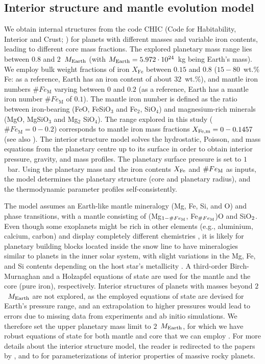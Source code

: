 \documentclass[draft]{agujournal2019} %
\begin{document}
\subsection{Interior structure and mantle evolution model}
\label{sec:int_struc}

We obtain internal structures from the code CHIC (Code for Habitability, Interior and Crust; ) for planets with different masses and variable iron contents, leading to different core mass fractions. The explored planetary mass range lies between $0.8$ and $2$~$M_{\rm Earth}$ (with $M_{\rm Earth}=5.972 \cdot 10^{\rm 24}$~kg being Earth's mass). We employ bulk weight fractions of iron $X_{\mathrm{Fe}}$ between $0.15$ and $0.8$ ($15-80$~wt.\% Fe: as a reference, Earth has an iron content of about $32$~wt.\%), and mantle iron numbers $\# Fe_{\mathrm{M}}$ varying between $0$ and $0.2$ (as a reference, Earth has a mantle iron number $\# Fe_{\mathrm{M}}$ of $0.1$). 
The mantle iron number is defined as the ratio between iron-bearing (FeO, FeSiO$_{3}$ and Fe$_{2}$, SiO$_{4}$) and magnesium-rich minerals (MgO, MgSiO$_{3}$ and Mg$_{2}$ SiO$_{4}$). The range explored in this study ($\# Fe_{\mathrm{M}}=0-0.2$) corresponds to mantle iron mass fractions $X_{\rm Fe,m}=0-0.1457$ (see also ). The interior structure model solves the hydrostatic, Poisson, and mass equations from the planetary centre up to its surface in order to obtain interior pressure, gravity, and mass profiles. The planetary surface pressure is set to $1$~bar. Using the planetary mass and the iron contents $X_{\rm Fe}$ and $\# Fe_{\rm M}$ as inputs, the model determines the planetary structure (core and planetary radius), and the thermodynamic parameter profiles self-consistently. 

The model assumes an Earth-like mantle mineralogy (Mg, Fe, Si, and O) and phase transitions, with a mantle consisting of (Mg$_{1-\#Fe_{\rm M}}$, Fe$_{\# Fe_{\rm M}}$)O and SiO$_{\rm 2}$. Even though some exoplanets might be rich in other elements (e.g., aluminium, calcium, carbon) and display completely different chemistries \cite{kuchner2005extrasolar,dorn2019new}, it is likely for planetary building blocks located inside the snow line to have mineralogies similar to planets in the inner solar system, with slight variations in the Mg, Fe, and Si contents depending on the host star's metallicity \cite{bitsch2020influence}. A third-order Birch-Murnaghan \cite{stixrude2009thermodynamics} and a Holzapfel \cite{bouchet2013ab} equations of state are used for the mantle and the core (pure iron), respectively. Interior structures of planets with masses beyond $2$~$M_{\rm Earth}$ are not explored, as the employed equations of state are devised for Earth's pressure range, and an extrapolation to higher pressures would lead to errors due to missing data from experiments and ab initio simulations. We therefore set the upper planetary mass limit to $2$~$M_{\rm Earth}$, for which we have robust equations of state for both mantle and core that we can employ \cite{hakim2018new}. For more details about the interior structure model, the reader is redirected to the papers by , and to  for parameterizations of interior properties of massive rocky planets.
\end{document}
